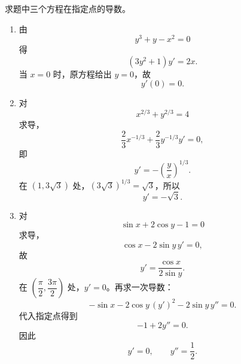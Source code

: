 \begin{xexercise}[20.1.4 练习题 2]
求题中三个方程在指定点的导数。
\end{xexercise}
\begin{xsolution}
\begin{enumerate}[label=(\arabic*)]
  \item 由
  \[
    y^3+y-x^2=0
  \]
  得
  \[
    (3y^2+1)y'=2x.
  \]
  当 $x=0$ 时，原方程给出 $y=0$，故
  \[
    \boxed{y'(0)=0}.
  \]

  \item 对
  \[
    x^{2/3}+y^{2/3}=4
  \]
  求导，
  \[
    \frac23x^{-1/3}+\frac23y^{-1/3}y'=0,
  \]
  即
  \[
    y'=-\left(\frac yx\right)^{1/3}.
  \]
  在 $(1,3\sqrt3)$ 处，$(3\sqrt3)^{1/3}=\sqrt3$，所以
  \[
    \boxed{y'=-\sqrt3}.
  \]

  \item 对
  \[
    \sin x+2\cos y-1=0
  \]
  求导，
  \[
    \cos x-2\sin y\,y'=0,
  \]
  故
  \[
    y'=\frac{\cos x}{2\sin y}.
  \]
  在 $\left(\dfrac\pi2,\dfrac{3\pi}2\right)$ 处，$y'=0$。再求一次导数：
  \[
    -\sin x-2\cos y\,(y')^2-2\sin y\,y''=0.
  \]
  代入指定点得到
  \[
    -1+2y''=0.
  \]
  因此
  \[
    \boxed{y'=0,\qquad y''=\frac12}.
  \]
\end{enumerate}
\end{xsolution}

